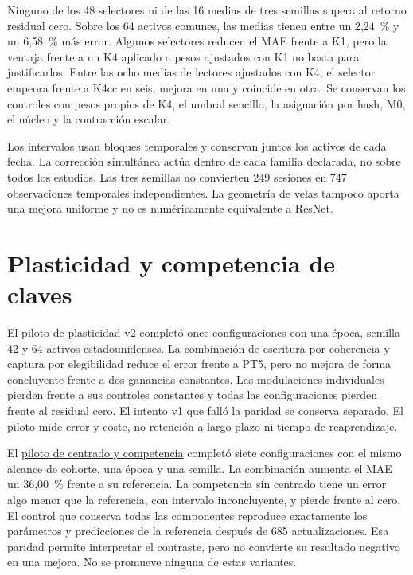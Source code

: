 \documentclass[11pt,a4paper]{report}
\begin{document}
Ninguno de los 48 selectores ni de las 16 medias de tres semillas supera al
retorno residual cero. Sobre los 64 activos comunes, las medias tienen entre
un 2,24~\% y un 6,58~\% más error. Algunos selectores reducen el MAE frente a
K1, pero la ventaja frente a un K4 aplicado a pesos ajustados con K1 no basta
para justificarlos. Entre las ocho medias de lectores ajustados con K4, el
selector empeora frente a K4cc en seis, mejora en una y coincide en otra.
Se conservan los controles con pesos propios de K4, el umbral sencillo, la
asignación por hash, M0, el núcleo y la contracción escalar.

Los intervalos usan bloques temporales y conservan juntos los activos de cada
fecha. La corrección simultánea actúa dentro de cada familia declarada, no
sobre todos los estudios. Las tres semillas no convierten 249 sesiones en
747 observaciones temporales independientes. La geometría de velas tampoco
aporta una mejora uniforme y no es numéricamente equivalente a ResNet.

\section{Plasticidad y competencia de claves}
El \href{https://github.com/GonxKZ/mars-titan/blob/8b7e2a5600be568cc1299f2a661da15b5090c45e/reports/research/neural-plasticity-20261020/development-v2/README.md}{piloto de plasticidad v2}
completó once configuraciones con una época, semilla 42 y 64 activos
estadounidenses. La combinación de escritura por coherencia y captura por
elegibilidad reduce el error frente a PT5, pero no mejora de forma concluyente
frente a dos ganancias constantes. Las modulaciones individuales pierden
frente a sus controles constantes y todas las configuraciones pierden frente
al residual cero. El intento v1 que falló la paridad se conserva separado.
El piloto mide error y coste, no retención a largo plazo ni tiempo de
reaprendizaje.

El \href{https://github.com/GonxKZ/mars-titan/blob/8b7e2a5600be568cc1299f2a661da15b5090c45e/reports/research/key-competition-20261020/development-v1/README.md}{piloto de centrado y competencia}
completó siete configuraciones con el mismo alcance de cohorte, una época y
una semilla. La combinación aumenta el MAE un 36,00~\% frente a su referencia.
La competencia sin centrado tiene un error algo menor que la referencia, con
intervalo inconcluyente, y pierde frente al cero. El control que conserva
todas las componentes reproduce exactamente los parámetros y predicciones
de la referencia después de 685 actualizaciones. Esa paridad permite
interpretar el contraste, pero no convierte su resultado negativo en una
mejora. No se promueve ninguna de estas variantes.
\end{document}
